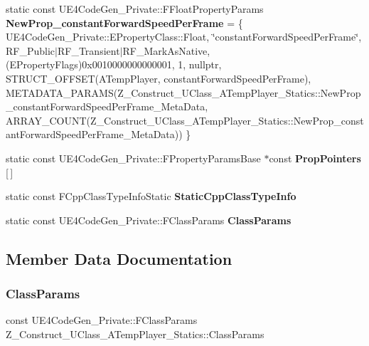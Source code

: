 \begin{DoxyCompactItemize}
\item 
\mbox{\label{struct_z___construct___u_class___a_temp_player___statics_abf70f0038b2bb2ba266c2c23220330e4}} 
static const U\+E4\+Code\+Gen\+\_\+\+Private\+::\+F\+Float\+Property\+Params {\bfseries New\+Prop\+\_\+constant\+Forward\+Speed\+Per\+Frame} = \{ U\+E4\+Code\+Gen\+\_\+\+Private\+::\+E\+Property\+Class\+::\+Float, \char`\"{}constant\+Forward\+Speed\+Per\+Frame\char`\"{}, R\+F\+\_\+\+Public$\vert$R\+F\+\_\+\+Transient$\vert$R\+F\+\_\+\+Mark\+As\+Native, (E\+Property\+Flags)0x0010000000000001, 1, nullptr, S\+T\+R\+U\+C\+T\+\_\+\+O\+F\+F\+S\+E\+T(\+A\+Temp\+Player, constant\+Forward\+Speed\+Per\+Frame), M\+E\+T\+A\+D\+A\+T\+A\+\_\+\+P\+A\+R\+A\+M\+S(\+Z\+\_\+\+Construct\+\_\+\+U\+Class\+\_\+\+A\+Temp\+Player\+\_\+\+Statics\+::\+New\+Prop\+\_\+constant\+Forward\+Speed\+Per\+Frame\+\_\+\+Meta\+Data, A\+R\+R\+A\+Y\+\_\+\+C\+O\+U\+N\+T(\+Z\+\_\+\+Construct\+\_\+\+U\+Class\+\_\+\+A\+Temp\+Player\+\_\+\+Statics\+::\+New\+Prop\+\_\+constant\+Forward\+Speed\+Per\+Frame\+\_\+\+Meta\+Data)) \}
\item 
static const U\+E4\+Code\+Gen\+\_\+\+Private\+::\+F\+Property\+Params\+Base $\ast$const {\bfseries Prop\+Pointers} \mbox{[}$\,$\mbox{]}
\item 
static const F\+Cpp\+Class\+Type\+Info\+Static {\bfseries Static\+Cpp\+Class\+Type\+Info}
\item 
static const U\+E4\+Code\+Gen\+\_\+\+Private\+::\+F\+Class\+Params {\bfseries Class\+Params}
\end{DoxyCompactItemize}


\subsection{Member Data Documentation}
\mbox{\label{struct_z___construct___u_class___a_temp_player___statics_adf3d7732f98aa59400e14f1e212fdbdc}} 
\subsubsection{\texorpdfstring{ClassParams}{ClassParams}}
{\footnotesize\ttfamily const U\+E4\+Code\+Gen\+\_\+\+Private\+::\+F\+Class\+Params Z\+\_\+\+Construct\+\_\+\+U\+Class\+\_\+\+A\+Temp\+Player\+\_\+\+Statics\+::\+Class\+Params\hspace{0.3cm}{\ttfamily [static]}}

